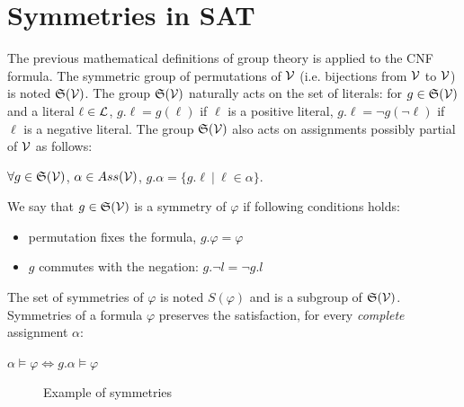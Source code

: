 \section{Symmetries in SAT}

The previous mathematical definitions of group theory is applied to the CNF formula.
The symmetric group of permutations of $\mathcal{V}$ (i.e. bijections from $\mathcal{V}$ to $\mathcal{V}$) is noted
$\mathfrak{S}(\mathcal{V})$. The group $\mathfrak{S}(\mathcal{V})$ naturally acts on the set of literals: for $g
\in \mathfrak{S}(\mathcal{V})$ and a literal $\ell \in \mathcal{L} $, $g.\ell = g(\ell)$ if $\ell$ is a
positive literal, $g.\ell = \neg g(\neg \ell)$ if $\ell$ is a negative literal.
The group $\mathfrak{S}(\mathcal{V})$ also acts on  assignments possibly partial of $\mathcal{V}$ as follows: 
\begin{center}
	$\forall g \in \mathfrak{S}(\mathcal{V})$, $\alpha \in Ass(\mathcal{V})$, $g.\alpha = \{ g.\ell ~|~ \ell \in \alpha \}$.
\end{center}

 We say that $g\in \mathfrak{S}(\mathcal{V})$ is a symmetry of $ \varphi$ if following conditions holds:
\begin{itemize}[topsep=0em]
	\item permutation fixes the formula, $g.\varphi =  \varphi$ 
	\item $g$  commutes with the negation: $g.\neg l  = \neg g.l$
\end{itemize}

The set of symmetries of $\varphi$ is noted $S(\varphi)$ and is a subgroup of $\mathfrak{S}(\mathcal{V})$.
Symmetries of a formula $\varphi$ preserves the satisfaction, for every \emph{complete} assignment $\alpha$:

\begin{center}
	$\alpha \models \varphi\Leftrightarrow g.\alpha \models \varphi$
\end{center}


\begin{figure}[!htbp]
	
	\caption{Example of symmetries}
\end{figure}





